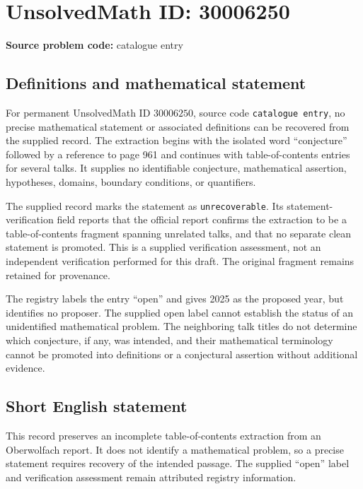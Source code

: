 \documentclass[11pt]{article}
\begin{document}
\section*{UnsolvedMath ID: 30006250}
\textbf{Source problem code:} catalogue entry
\subsection{Definitions and mathematical statement}
For permanent UnsolvedMath ID \(30006250\), source code \texttt{catalogue entry}, no precise mathematical statement or associated definitions can be recovered from the supplied record. The extraction begins with the isolated word ``conjecture'' followed by a reference to page 961 and continues with table-of-contents entries for several talks. It supplies no identifiable conjecture, mathematical assertion, hypotheses, domains, boundary conditions, or quantifiers.

The supplied record marks the statement as \texttt{unrecoverable}. Its statement-verification field reports that the official report confirms the extraction to be a table-of-contents fragment spanning unrelated talks, and that no separate clean statement is promoted. This is a supplied verification assessment, not an independent verification performed for this draft. The original fragment remains retained for provenance.

The registry labels the entry ``open'' and gives 2025 as the proposed year, but identifies no proposer. The supplied open label cannot establish the status of an unidentified mathematical problem. The neighboring talk titles do not determine which conjecture, if any, was intended, and their mathematical terminology cannot be promoted into definitions or a conjectural assertion without additional evidence.
\subsection{Short English statement}
This record preserves an incomplete table-of-contents extraction from an Oberwolfach report. It does not identify a mathematical problem, so a precise statement requires recovery of the intended passage. The supplied ``open'' label and verification assessment remain attributed registry information.
\end{document}
